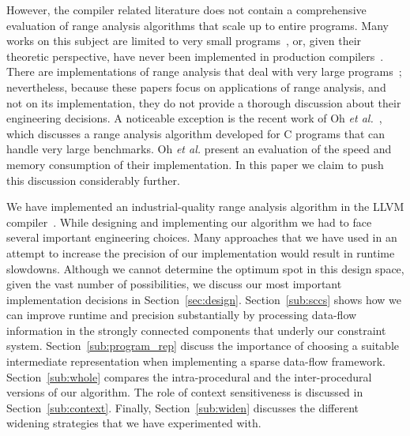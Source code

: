 \documentclass{llncs}
\begin{document}
However, the compiler related literature does not contain a comprehensive
evaluation of range analysis algorithms that scale up to entire programs.
Many works on this subject are limited to very small
programs~\cite{Mahlke01,Simon08,Stephenson00}, or, given their theoretic
perspective, have never been implemented in production
compilers~\cite{Gawlitza09,Lakhdar11,Su04,Su05}.
There are implementations of range analysis that deal with very large
programs~\cite{Bertrane10,Cousot09,Logozzo08,Oh11}; nevertheless, because
these papers focus on applications of range analysis,
and not on its implementation, they do not provide a thorough discussion
about their engineering decisions.
A noticeable exception is the recent work of Oh {\em et al.}~\cite{Oh12},
which discusses a range analysis algorithm developed for C programs that can
handle very large benchmarks.
Oh {\em et al.} present an evaluation of the speed and memory consumption of
their implementation.
In this paper we claim to push this discussion considerably further.

We have implemented an industrial-quality range analysis algorithm in the
LLVM compiler~\cite{Lattner04}.
While designing and implementing our algorithm we had to face several important
engineering choices.
Many approaches that we have used in an attempt to increase the precision of
our implementation would result in runtime slowdowns.
Although we cannot determine the optimum spot in this design space, given the
vast number of possibilities, we discuss our most important implementation
decisions in Section~\ref{sec:design}.
Section~\ref{sub:sccs} shows how we can improve runtime and precision
substantially by processing data-flow information in the strongly connected
components that underly our constraint system.
Section~\ref{sub:program_rep} discuss the importance of choosing a suitable
intermediate representation when implementing a sparse data-flow framework.
Section~\ref{sub:whole} compares the intra-procedural and the inter-procedural
versions of our algorithm.
The role of context sensitiveness is discussed in Section~\ref{sub:context}.
Finally, Section~\ref{sub:widen} discusses the different widening strategies
that we have experimented with.
\end{document}
